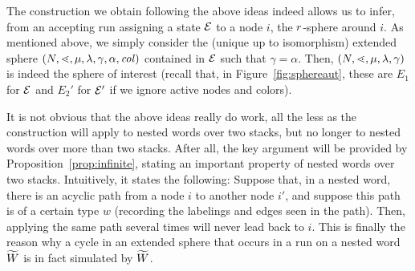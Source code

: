 \documentclass{LMCS}
\begin{document}
The construction we obtain following the above ideas indeed allows us to
infer, from an accepting run assigning a state $\mathcal{E}$ to a node $i$, the
$r$-sphere around $i$. As mentioned above, we simply consider the
(unique up to isomorphism) extended sphere
$(N,\mathord{\lessdot},\mu,\lambda,\gamma,\alpha,\mathit{col})$ contained in $\mathcal{E}$ such that
$\gamma = \alpha$. Then, $(N,\mathord{\lessdot},\mu,\lambda,\gamma)$ is indeed the
sphere of interest (recall that, in Figure~\ref{fig:sphereaut}, these are
$E_1$ for $\mathcal{E}$ and $E_2'$ for $\mathcal{E}'$ if we ignore active nodes and
colors).

It is not obvious that the above ideas really do work, all the less as the
construction will apply to nested words over two stacks, but no longer to
nested words over more than two stacks. After all, the key argument will be
provided by Proposition~\ref{prop:infinite}, stating an important property of
nested words over two stacks. Intuitively, it states the following: Suppose
that, in a nested word, there is an acyclic path from a node $i$ to another
node $i'$, and suppose this path is of a certain type $w$ (recording the
labelings and edges seen in the path). Then, applying the same path several
times will never lead back to $i$. This is finally the reason why a cycle in
an extended sphere that occurs in a run on a nested word ${\widetilde{W}}$ is in fact
simulated by ${\widetilde{W}}$.
\end{document}
